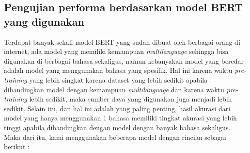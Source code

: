 \subsection{Pengujian performa berdasarkan model BERT yang digunakan}

Terdapat banyak sekali model BERT yang sudah dibuat oleh berbagai orang di internet, ada model yang memiliki kemampuan \textit{multilanguage} sehingga bisa digunakan di berbagai bahasa sekaligus, namun kebanyakan model yang beredar adalah model yang menggunakan bahasa yang spesifik. Hal ini karena waktu \textit{pre-training} yang lebih singkat karena dataset yang lebih sedikit apabila dibandingkan model dengan kemampuan \textit{multilanguage} dan karena waktu \textit{pre-training} lebih sedikit, maka sumber daya yang digunakan juga menjadi lebih sedikit. Selain itu, dan hal ini adalah yang paling penting, hasil akurasi dari model yang hanya menggunakan 1 bahasa memiliki tingkat akurasi yang lebih tinggi apabila dibandingkan dengan model dengan banyak bahasa sekaligus. Maka dari itu, kami menggunakan beberapa model dengan rincian sebagai berikut :

